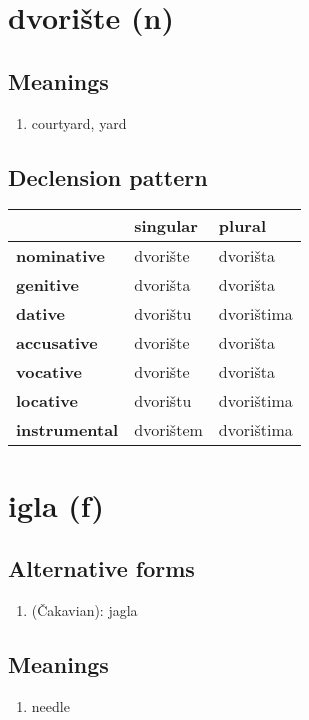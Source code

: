 \filbreak
\section{dvorište (n)}
\subsection*{Meanings}
\begin{enumerate}
\item courtyard, yard
\end{enumerate}
\subsection*{Declension pattern}
\begin{tabularx}{\linewidth}{Xll}
\toprule
{} &   singular &      plural \\
\midrule
\textbf{nominative  } &   dvorište &    dvorišta \\
\textbf{genitive    } &   dvorišta &    dvorišta \\
\textbf{dative      } &   dvorištu &  dvorištima \\
\textbf{accusative  } &   dvorište &    dvorišta \\
\textbf{vocative    } &   dvorište &    dvorišta \\
\textbf{locative    } &   dvorištu &  dvorištima \\
\textbf{instrumental} &  dvorištem &  dvorištima \\
\bottomrule
\end{tabularx}

\filbreak
\section{igla (f)}
\subsection*{Alternative forms}
\begin{enumerate}
\item (Čakavian): jagla
\end{enumerate}
\subsection*{Meanings}
\begin{enumerate}
\item needle
\end{enumerate}
